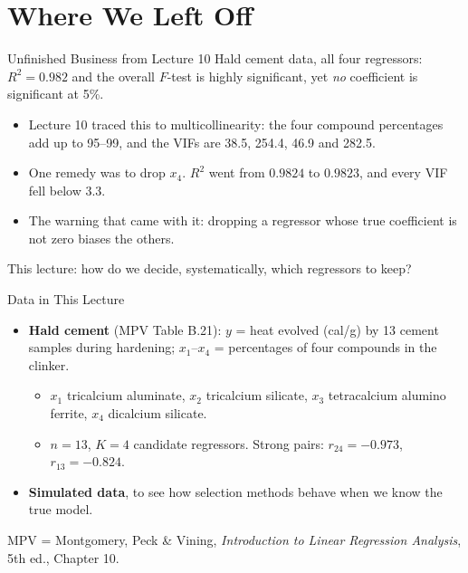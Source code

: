 \section{Where We Left Off}


\begin{frame}{Unfinished Business from Lecture 10}
    Hald cement data, all four regressors: $R^2=0.982$ and the overall $F$-test is highly significant, yet \emph{no} coefficient is significant at 5\%.
    \svspace{0.5em}
    \begin{itemize}
        \item Lecture 10 traced this to multicollinearity: the four compound percentages add up to 95--99, and the VIFs are 38.5, 254.4, 46.9 and 282.5.
        \item One remedy was to drop $x_4$. $R^2$ went from $0.9824$ to $0.9823$, and every VIF fell below 3.3.
        \item The warning that came with it: dropping a regressor whose true coefficient is not zero biases the others.
    \end{itemize}
    \svspace{0.5em}
    This lecture: how do we decide, systematically, which regressors to keep?
\end{frame}


\begin{frame}{Data in This Lecture}
    \begin{itemize}
        \item \textbf{Hald cement} (MPV Table B.21): $y$ = heat evolved (cal/g) by 13 cement samples during hardening; $x_1$--$x_4$ = percentages of four compounds in the clinker.
        \begin{itemize}
            \item $x_1$ tricalcium aluminate, $x_2$ tricalcium silicate, $x_3$ tetracalcium alumino ferrite, $x_4$ dicalcium silicate.
            \item $n=13$, $K=4$ candidate regressors. Strong pairs: $r_{24}=-0.973$, $r_{13}=-0.824$.
        \end{itemize}
        \item \textbf{Simulated data}, to see how selection methods behave when we know the true model.
    \end{itemize}
    \svspace{0.3em}
    MPV = Montgomery, Peck \& Vining, \emph{Introduction to Linear Regression Analysis}, 5th ed., Chapter 10.
\end{frame}



